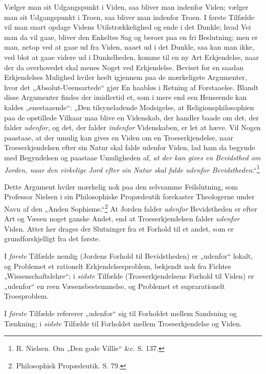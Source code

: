 \documentclass[12pt,a4paper]{book}
\newcommand{\opage}[1]{\marginnote{\footnotesize\textit{[#1]}}}
\begin{document}
Vælger man sit Udgangspunkt i Viden, saa bliver man
indenfor Viden; vælger man sit Udgangspunkt i Troen, saa
bliver man indenfor Troen. I første Tilfælde vil man snart
opdage Videns Utilstrækkelighed og ende i det Dunkle;
hvad Vei man da vil gaae, bliver den Enkeltes Sag og
beroer paa en fri Beslutning; men er man, netop ved at
gaae ud fra Viden, naaet ud i det Dunkle, saa kan man
ikke, ved blot at gaae videre ud i Dunkelheden, komme
til en ny Art Erkjendelse, naar der da overhovedet skal
menes Noget ved Erkjendelse. Beviset for en saadan
Erkjendelses Mulighed hviler heelt igjennem paa de
mærkeligste Argumenter, hvor det „Absolut-Ueensartede“
gjør En haabløs i Retning af Forstaaelse. Blandt disse
\opage{37}\setcounter{footnote}{0}%
Argumenter findes der imidlertid et, som i mere end
een Henseende kan kaldes „enestaaende“: „Den tilsyneladende
Modsigelse, at Religionsphilosophien paa de opstillede
Vilkaar maa blive en Videnskab, der handler
baade om det, der falder \emph{udenfor}, og det, der falder
\emph{indenfor} Videnskaben, er let at hæve. Vil Nogen
paastaae, at der umulig kan gives en Viden om en
Troeserkjendelse, naar Troeserkjendelsen efter sin Natur
skal falde udenfor Viden, lad ham da begynde med Begyndelsen
og paastaae Umuligheden af, \emph{at der kan
gives en Bevidsthed om Jorden, naar den virkelige
Jord efter sin Natur skal falde udenfor
Bevidstheden}.“\footnote{R. Nielsen. Om „Den gode Villie“ \&c. S. 137.}

Dette Argument hviler mærkelig nok paa den selvsamme
Feilslutning, som Professor Nielsen i sin Philosophiske Propædeutik
forekaster Theologerne under Navn af den „Anden
Sophisme.“\footnote{Philosophisk Propædeutik. S. 79.} At Jorden falder \emph{udenfor} Bevidstheden
er efter Art og Væsen noget ganske Andet,
end at Troeserkjendelsen falder \emph{udenfor} Viden. Atter
her drages der Slutninger fra et Forhold til et andet,
som er grundforskjelligt fra det første.

I \emph{første} Tilfælde nemlig (Jordens Forhold til
Bevidstheden) er „udenfor“ lokalt, og Problemet et rationelt
Erkjendelsesproblem, bekjendt nok fra Fichtes
„Wissenschaftslehre“; i \emph{sidste} Tilfælde (Troeserkjendelsens
Forhold til Viden) er „udenfor“ en reen Væsensbestemmelse,
og Problemet et suprarationelt Troesproblem.

\opage{38}\setcounter{footnote}{0}%
I \emph{første} Tilfælde refererer „udenfor“ sig til Forholdet
mellem Sandsning og Tænkning; i \emph{sidste} Tilfælde
til Forholdet mellem Troeserkjendelse og Viden.
\end{document}
